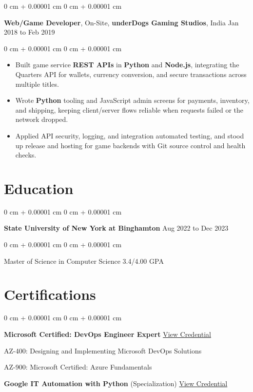 \documentclass[10pt, letterpaper]{article}
\newenvironment{highlights}{
    \begin{itemize}[
        topsep=0.04 cm,
        parsep=0.04 cm,
        partopsep=0pt,
        itemsep=0pt,
        leftmargin=0 cm + 10pt
    ]
}{
    \end{itemize}
} %
\newenvironment{onecolentry}{
    \begin{adjustwidth}{
        0 cm + 0.00001 cm
    }{
        0 cm + 0.00001 cm
    }
}{
    \end{adjustwidth}
} %
\newcommand{\resumeheading}[2]{%
    \begin{onecolentry}
        #1 \hfill #2
    \end{onecolentry}
} %
\begin{document}
\vspace{0.15 cm}
\resumeheading{\textbf{Web/Game Developer}, On-Site, \textbf{underDogs Gaming Studios}, India}{Jan 2018 to Feb 2019}

\begin{onecolentry}
\begin{highlights}
	\item Built game service \textbf{REST APIs} in \textbf{Python} and \textbf{Node.js}, integrating the Quarters API for wallets, currency conversion, and secure transactions across multiple titles.
	\item Wrote \textbf{Python} tooling and JavaScript admin screens for payments, inventory, and shipping, keeping client/server flows reliable when requests failed or the network dropped.
	\item Applied API security, logging, and integration automated testing, and stood up release and hosting for game backends with Git source control and health checks.
\end{highlights}
\end{onecolentry}




\vspace{0.2 cm}

\section{Education}

\resumeheading{\textbf{State University of New York at Binghamton}}{Aug 2022 to Dec 2023}

\begin{onecolentry}
	Master of Science in Computer Science \hfill 3.4/4.00 GPA
\end{onecolentry}


\vspace{0.2 cm}

\section{Certifications}

\begin{onecolentry}
	\textbf{Microsoft Certified: DevOps Engineer Expert} \hfill \href{https://drive.google.com/file/d/1AjPcmWMrnxSNEUaSC6XzCVqHik7d5M1M/view?usp=drive_link}{View Credential}

	AZ-400: Designing and Implementing Microsoft DevOps Solutions

	AZ-900: Microsoft Certified: Azure Fundamentals

	\textbf{Google IT Automation with Python} (Specialization) \hfill \href{https://www.coursera.org/account/accomplishments/specialization/certificate/59YMRC67LBUQ}{View Credential}
\end{onecolentry}
\end{document}
